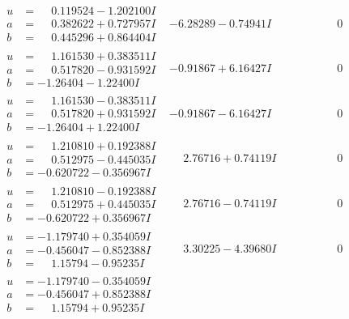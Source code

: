 \documentclass[1p]{elsarticle_modified}
\theoremstyle{definition}
\begin{document}
$$\begin{array}{c|c|c}
\begin{aligned}
u &= \phantom{-}0.119524 - 1.202100 I \\
a &= \phantom{-}0.382622 + 0.727957 I \\
b &= \phantom{-}0.445296 + 0.864404 I\end{aligned}
 & -6.28289 - 0.74941 I & \phantom{-0.000000 } 0 \\ \hline\begin{aligned}
u &= \phantom{-}1.161530 + 0.383511 I \\
a &= \phantom{-}0.517820 - 0.931592 I \\
b &= -1.26404 - 1.22400 I\end{aligned}
 & -0.91867 + 6.16427 I & \phantom{-0.000000 } 0 \\ \hline\begin{aligned}
u &= \phantom{-}1.161530 - 0.383511 I \\
a &= \phantom{-}0.517820 + 0.931592 I \\
b &= -1.26404 + 1.22400 I\end{aligned}
 & -0.91867 - 6.16427 I & \phantom{-0.000000 } 0 \\ \hline\begin{aligned}
u &= \phantom{-}1.210810 + 0.192388 I \\
a &= \phantom{-}0.512975 - 0.445035 I \\
b &= -0.620722 - 0.356967 I\end{aligned}
 & \phantom{-}2.76716 + 0.74119 I & \phantom{-0.000000 } 0 \\ \hline\begin{aligned}
u &= \phantom{-}1.210810 - 0.192388 I \\
a &= \phantom{-}0.512975 + 0.445035 I \\
b &= -0.620722 + 0.356967 I\end{aligned}
 & \phantom{-}2.76716 - 0.74119 I & \phantom{-0.000000 } 0 \\ \hline\begin{aligned}
u &= -1.179740 + 0.354059 I \\
a &= -0.456047 - 0.852388 I \\
b &= \phantom{-}1.15794 - 0.95235 I\end{aligned}
 & \phantom{-}3.30225 - 4.39680 I & \phantom{-0.000000 } 0 \\ \hline\begin{aligned}
u &= -1.179740 - 0.354059 I \\
a &= -0.456047 + 0.852388 I \\
b &= \phantom{-}1.15794 + 0.95235 I\end{aligned}

\end{array}$$
\end{document}

